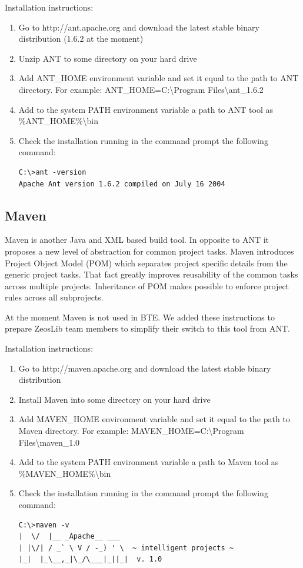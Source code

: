 \documentclass[a4paper,12pt,oneside]{book}
\begin{document}
Installation instructions:
\begin{enumerate}
  \item Go to http://ant.apache.org and download the latest stable binary distribution (1.6.2 at the moment)
	\item Unzip ANT to some directory on your hard drive
	\item
	  Add ANT\_HOME environment variable and set it equal to the path to ANT directory.
		For example: ANT\_HOME=C:\textbackslash Program Files\textbackslash ant\_1.6.2
	\item Add to the system PATH environment variable a path to ANT tool as \%ANT\_HOME\%\textbackslash bin
	\item Check the installation running in the command prompt the following command:
	  \begin{verbatim}
C:\>ant -version
Apache Ant version 1.6.2 compiled on July 16 2004
    \end{verbatim}
\end{enumerate}

\subsection{Maven}
Maven is another Java and XML based build tool.
In opposite to ANT it proposes a new level of abstraction for common project tasks.
Maven introduces Project Object Model (POM) which separates project specific details from the generic project tasks.
That fact greatly improves reusability of the common tasks across multiple projects.
Inheritance of POM makes possible to enforce project rules across all subprojects.

At the moment Maven is not used in BTE.
We added these instructions to prepare ZeosLib team members to simplify their switch to this tool from ANT.

Installation instructions:
\begin{enumerate}
  \item Go to http://maven.apache.org and download the latest stable binary distribution
	\item Install Maven into some directory on your hard drive
	\item
	  Add MAVEN\_HOME environment variable and set it equal to the path to Maven directory.
		For example: MAVEN\_HOME=C:\textbackslash Program Files\textbackslash maven\_1.0
	\item Add to the system PATH environment variable a path to Maven tool as \%MAVEN\_HOME\%\textbackslash bin
	\item Check the installation running in the command prompt the following command:
	  \begin{verbatim}
C:\>maven -v
|  \/  |__ _Apache__ ___
| |\/| / _` \ V / -_) ' \  ~ intelligent projects ~
|_|  |_\__,_|\_/\___|_||_|  v. 1.0
    \end{verbatim}
\end{enumerate}
\end{document}
